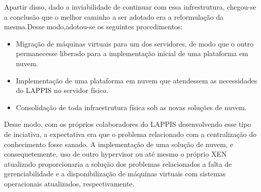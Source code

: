       Apartir disso, dado a inviabilidade de continuar com essa infrestrutura, chegou-se a conclusão que o melhor caminho a ser adotado era a reformulação da mesma.Desse modo,adotou-se os seguintes procedimentos:
\begin{itemize}
      \item Migração de máquinas virtuais para um dos servidores, de modo que o outro permanecesse liberado para a implementação inicial de uma plataforma em nuvem.
      \item	Implementação de uma plataforma em nuvem que atendessem as necessidades do LAPPIS no servidor físico.
      \item Consolidação de toda infraestrutura física sob as novas soluções de nuvem.
\end{itemize}      
      
      
Desse modo, com os próprios colaboradores do LAPPIS desenvolvendo esse tipo de inciativa, a expectativa era que o problema relacionado com a centralização do conhecimento fosse sanado. A implementação de uma solução de nuvem, e consequetemente, uso de outro hypervisor ou até mesmo o próprio XEN atualizado proporcionaria a solução dos problemas relacionados a falta de gerenciabilidade e a disponibilização de máquinas virtuais com sistemas operacionais atualizados, respectivamente.        
                
